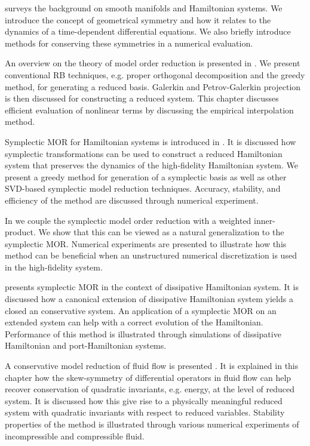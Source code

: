  surveys the background on smooth manifolds and Hamiltonian systems. We introduce the concept of geometrical symmetry and how it relates to the dynamics of a time-dependent differential equations. We also briefly introduce methods for conserving these symmetries in a numerical evaluation.

An overview on the theory of model order reduction is presented in . We present conventional RB techniques, e.g. proper orthogonal decomposition and the greedy method, for generating a reduced basis. Galerkin and Petrov-Galerkin projection is then discussed for constructing a reduced system. This chapter discusses efficient evaluation of nonlinear terms by discussing the empirical interpolation method.

Symplectic MOR for Hamiltonian systems is introduced in . It is discussed how symplectic transformations can be used to construct a reduced Hamiltonian system that preserves the dynamics of the high-fidelity Hamiltonian system. We present a greedy method for generation of a symplectic basis as well as other SVD-based symplectic model reduction techniques. Accuracy, stability, and efficiency of the method are discussed through numerical experiment.

In  we couple the symplectic model order reduction with a weighted inner-product. We show that this can be viewed as a natural generalization to the symplectic MOR. Numerical experiments are presented to illustrate how this method can be beneficial when an unstructured numerical discretization is used in the high-fidelity system.

 presents symplectic MOR in the context of dissipative Hamiltonian system. It is discussed how a canonical extension of dissipative Hamiltonian system yields a closed an conservative system. An application of a symplectic MOR on an extended system can help with a correct evolution of the Hamiltonian. Performance of this method is illustrated through simulations of dissipative Hamiltonian and port-Hamiltonian systems.

A conservative model reduction of fluid flow is presented . It is explained in this chapter how the skew-symmetry of differential operators in fluid flow can help recover conservation of quadratic invariants, e.g. energy, at the level of reduced system. It is discussed how this give rise to a physically meaningful reduced system with quadratic invariants with respect to reduced variables. Stability properties of the method is illustrated through various numerical experiments of incompressible and compressible fluid.
